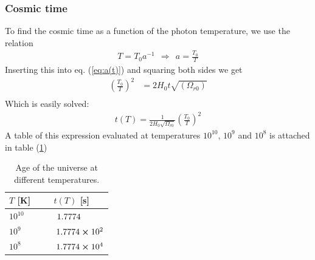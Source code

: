 \documentclass[reprint,english,notitlepage]{revtex4-1}  %
\numberwithin{equation}{section}
\begin{document}
\subsubsection{Cosmic time}
To find the cosmic time as a function of the photon temperature, we use the
relation
\begin{align}
	T = T_0 a^{-1} \ \ \Rightarrow \ \ a = \frac{T_0}{T}
\end{align}
Inserting this into eq. (\ref{eq:a(t)}) and squaring both sides we get
\begin{align}
	\left(\frac{T_0}{T}\right)^2 &= 2 H_0 t \sqrt{(\Omega_{r0})} \\
\end{align}
Which is easily solved:
\begin{align}
	t(T) = \frac{1}{2 H_0 \sqrt{\Omega_{r0}}} \left(\frac{T_0}{T}\right)^2
\end{align}
A table of this expression evaluated at temperatures $10^10$, $10^9$ and $10^8$
is attached in table (\ref{tab:t(T)})

\begin{table}[h!]
	\begin{tabular}{lc}
	\hline
	      $T$ [K] &   $t(T)$ [s] \\
	\hline
	\hline
	 $10^{10}$ 			& $\ \ \ \ \ \ 1.7774 \hspace{0.91cm} $ \\
	 $10^9$    			& $\ \ \ \ \ \ 1.7774\cross 10^2$ \\
	 $10^8$    			& $\ \ \ \ \ \ 1.7774\cross 10^4$ \\
	\hline
	\hline
	\end{tabular}
	\caption{Age of the universe at different temperatures.}
	\label{tab:t(T)}
\end{table}
\end{document}
